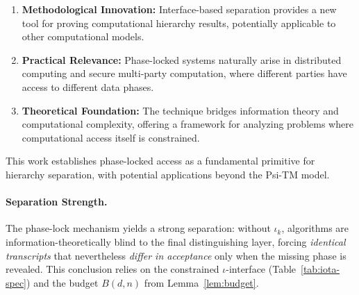 \begin{enumerate}
\item \textbf{Methodological Innovation:} Interface-based separation provides a new tool for proving computational hierarchy results, potentially applicable to other computational models.
\item \textbf{Practical Relevance:} Phase-locked systems naturally arise in distributed computing and secure multi-party computation, where different parties have access to different data phases.
\item \textbf{Theoretical Foundation:} The technique bridges information theory and computational complexity, offering a framework for analyzing problems where computational access itself is constrained.
\end{enumerate}

This work establishes phase-locked access as a fundamental primitive for hierarchy separation, with potential applications beyond the Psi-TM model.

\paragraph{Separation Strength.}
The phase-lock mechanism yields a strong separation: without $\iota_k$, algorithms are information-theoretically blind to the final distinguishing layer, forcing \emph{identical transcripts} that nevertheless \emph{differ in acceptance} only when the missing phase is revealed. This conclusion relies on the constrained $\iota$-interface (Table~\ref{tab:iota-spec}) and the budget $B(d,n)$ from Lemma~\ref{lem:budget}.

